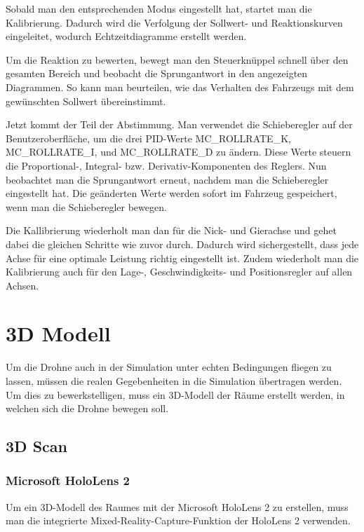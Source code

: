 Sobald man den entsprechenden Modus eingestellt hat, startet man die Kalibrierung. Dadurch wird die Verfolgung der Sollwert- und Reaktionskurven eingeleitet, wodurch Echtzeitdiagramme erstellt werden.

Um die Reaktion zu bewerten, bewegt man den Steuerknüppel schnell über den gesamten Bereich und beobacht die Sprungantwort in den angezeigten Diagrammen. So kann man beurteilen, wie das Verhalten des Fahrzeugs mit dem gewünschten Sollwert übereinstimmt.

Jetzt kommt der Teil der Abstimmung. Man verwendet die Schieberegler auf der Benutzeroberfläche, um die drei PID-Werte MC\_ROLLRATE\_K, MC\_ROLLRATE\_I, und MC\_ROLLRATE\_D zu ändern. Diese Werte steuern die Proportional-, Integral- bzw. Derivativ-Komponenten des Reglers. Nun beobachtet man die Sprungantwort erneut, nachdem man die Schieberegler eingestellt hat. Die geänderten Werte werden sofort im Fahrzeug gespeichert, wenn man die Schieberegler bewegen.

Die Kallibrierung wiederholt man dan für die Nick- und Gierachse und gehet dabei die gleichen Schritte wie zuvor durch. Dadurch wird sichergestellt, dass jede Achse für eine optimale Leistung richtig eingestellt ist. Zudem wiederholt man die Kalibrierung auch für den Lage-, Geschwindigkeits- und Positionsregler auf allen Achsen.


\section{3D Modell} \label{3d_modell:section}
Um die Drohne auch in der Simulation unter echten Bedingungen fliegen zu lassen, müssen die realen Gegebenheiten in die Simulation übertragen werden. Um dies zu bewerkstelligen, muss ein 3D-Modell der Räume erstellt werden, in welchen sich die Drohne bewegen soll.
    \subsection{3D Scan} \label{3d-scan:subsection}

        \subsubsection{Microsoft HoloLens 2} \label{hololens:subsubsection}
        Um ein 3D-Modell des Raumes mit der Microsoft HoloLens 2 zu erstellen, muss man die integrierte Mixed-Reality-Capture-Funktion der HoloLens 2 verwenden.
        
